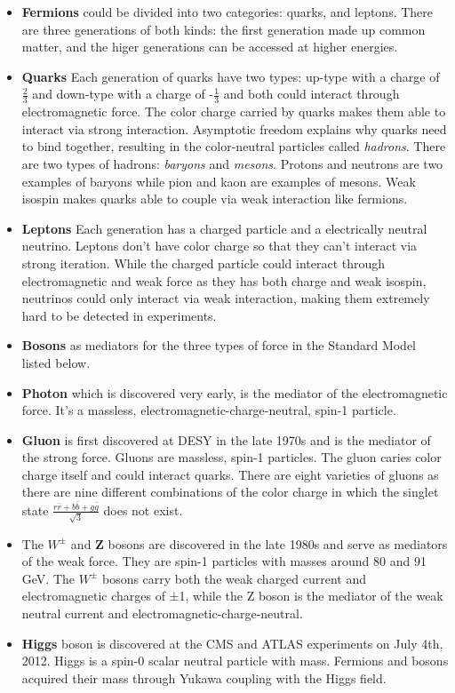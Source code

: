 \begin{itemize}
  \item \textbf{Fermions} could be divided into two categories: quarks, and leptons. There are three generations of both kinds: the first generation made up common matter, and the higer generations can be accessed at higher energies.
  \item \textbf{Quarks} Each generation of quarks have two types: up-type with a charge of $\frac{2}{3}$ and down-type with a charge of -$\frac{1}{3}$ and both could interact through electromagnetic force. The color charge carried by quarks makes them able to interact via strong interaction. Asymptotic freedom explains why quarks need to bind together, resulting in the color-neutral particles called \textit{hadrons}. There are two types of hadrons: \textit{baryons} and \textit{mesons}. Protons and neutrons are two examples of baryons while pion and kaon are examples of mesons. Weak isospin makes quarks able to couple via weak interaction like fermions.
  \item \textbf{Leptons} Each generation has a charged particle and a electrically neutral neutrino. Leptons don't have color charge so that they can't interact via strong iteration. While the charged particle could interact through electromagnetic and weak force as they has both charge and weak isospin, neutrinos could only interact via weak interaction, making them extremely hard to be detected in experiments.
  \item \textbf{Bosons} as mediators for the three types of force in the Standard Model listed below.
  \item \textbf{Photon} which is discovered very early, is the mediator of the electromagnetic force. It's a massless, electromagnetic-charge-neutral, spin-1 particle.
  \item \textbf{Gluon} is first discovered at DESY in the late 1970s and is the mediator of the strong force. Gluons are massless, spin-1 particles. The gluon caries color charge itself and could interact quarks. There are eight varieties of gluons as there are nine different combinations of the color charge in which the singlet state $\frac{r\bar{r}+b\bar{b}+g\bar{g}}{\sqrt{3}}$ does not exist.
  \item The \textbf{$W^{\pm}$} and \textbf{Z} bosons are discovered in the late 1980s and serve as mediators of the weak force. They are spin-1 particles with masses around 80 and 91 GeV. The \textbf{$W^{\pm}$} bosons carry both the weak charged current and electromagnetic charges of ±1, while the Z boson is the mediator of the weak neutral current and electromagnetic-charge-neutral.
  \item \textbf{Higgs} boson is discovered at the CMS and ATLAS experiments on July 4th, 2012\cite{Aad:2012tfa}\cite{Chatrchyan:2012xdj}. Higgs is a spin-0 scalar neutral particle with mass. Fermions and bosons acquired their mass through Yukawa coupling with the Higgs field.
\end{itemize}

